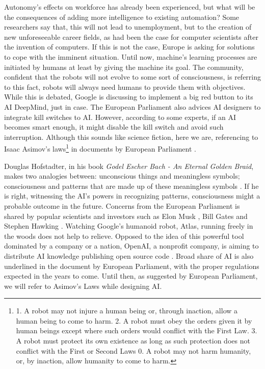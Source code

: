 \iffalse
Autonomy's effects on workforce has already been experienced, but what will be the consequences of adding more intelligence to existing automation? 
Some researchers say that, this will not lead to unemployment, but to the creation of new unforeseeable career fields, as had been the case for computer scientists after the invention of computers. 
If this is not the case, Europe is asking for solutions to cope with the imminent situation.
Until now, machine's learning processes are initiated by humans at least by giving the machine its goal. 
The community, confident that the robots will not evolve to some sort of consciousness, is referring to this fact, robots will always need humans to provide them with objectives. 
While this is debated, Google is discussing to implement a big red button to its AI DeepMind, just in case. 
The European Parliament also advices AI designers to integrate kill switches to AI. 
However, according to some experts, if an AI becomes smart enough, it might disable the kill switch and avoid such interruption. 
Although this sounds like science fiction, here we are, referencing to Isaac Asimov's laws\footnote{1. A robot may not injure a human being or, through inaction, allow a human being to come to harm. 2. A robot must obey the orders given it by human beings except where such orders would conflict with the First Law. 3. A robot must protect its own existence as long as such protection does not conflict with the First or Second Laws \cite{asimovLaws} 0. A robot may not harm humanity, or, by inaction, allow humanity to come to harm.} in documents by European Parliament \cite{civilLawRulesOnRobotics}.

Douglas Hofstadter, in his book \emph{Godel Escher Bach - An Eternal Golden Braid}, makes two analogies between: unconscious things and meaningless symbols; consciousness and patterns that are made up of these meaningless symbols \cite{hofstadter1980godel}. 
If he is right, witnessing the AI's powers in recognizing patterns, consciousness might a probable outcome in the future. 
Concerns from the European Parliament is shared by popular scientists and investors such as Elon Musk \cite{AIthreatEMusk}, Bill Gates \cite{AIthreatBGates} and Stephen Hawking \cite{AIthreatSHawking}. Watching Google's humanoid robot, Atlas, running freely in the woods does not help to relieve. Opposed to the idea of this powerful tool dominated by a company or a nation, OpenAI, a nonprofit company, is aiming to distribute AI knowledge publishing open source code \cite{openAI}. Broad share of AI is also underlined in the document by European Parliament, with the proper regulations expected in the years to come.
Until then, as suggested by European Parliament, we will refer to Asimov's Laws while designing AI.


